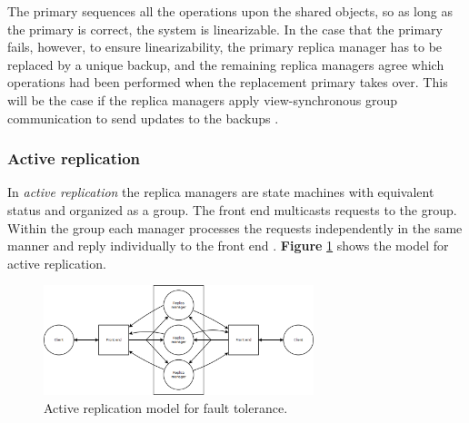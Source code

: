 The primary sequences all the operations upon the shared objects, so as long as the primary is correct, the system is linearizable. In the case that the primary fails, however, to ensure linearizability, the primary replica manager has to be replaced by a unique backup, and the remaining replica managers agree which operations had been performed when the replacement primary takes over. This will be the case if the replica managers apply view-synchronous group communication to send updates to the backups \cite{Coulouris:2011:DSC:2029110}.



\subsubsection{Active replication}

In \emph{active replication} the replica managers are state machines with equivalent status and organized as a group. The front end multicasts requests to the group. Within the group each manager processes the requests independently in the same manner and reply individually to the front end \cite{Coulouris:2011:DSC:2029110}. \textbf{Figure} \ref{fig:activereplication} shows the model for active replication.

\begin{figure}[h]
	\begin{center}
		\includegraphics[width=0.7\textwidth]{img/systems-and-architectures/activereplication}
	\end{center}
	\caption{Active replication model for fault tolerance.}
	\label{fig:activereplication}
\end{figure}


